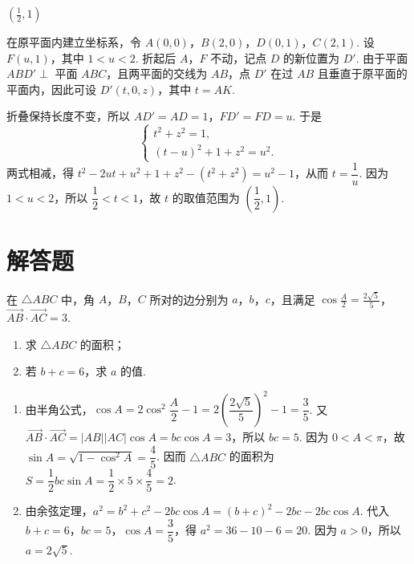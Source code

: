 \begin{answer}
\(\left(\frac{1}{2},1\right)\)
\end{answer}

\begin{solution}
在原平面内建立坐标系，令 \(A(0,0)\)，\(B(2,0)\)，\(D(0,1)\)，\(C(2,1)\). 设 \(F(u,1)\)，其中 \(1<u<2\). 折起后 \(A\)，\(F\) 不动，记点 \(D\) 的新位置为 \(D'\). 由于平面 \(ABD'\perp\) 平面 \(ABC\)，且两平面的交线为 \(AB\)，点 \(D'\) 在过 \(AB\) 且垂直于原平面的平面内，因此可设 \(D'(t,0,z)\)，其中 \(t=AK\).

折叠保持长度不变，所以 \(AD'=AD=1\)，\(FD'=FD=u\). 于是
\[
\begin{cases}
t^2+z^2=1,\\
(t-u)^2+1+z^2=u^2.
\end{cases}
\]
两式相减，得 \(t^2-2ut+u^2+1+z^2-(t^2+z^2)=u^2-1\)，从而 \(t=\dfrac1u\). 因为 \(1<u<2\)，所以 \(\dfrac12<t<1\)，故 \(t\) 的取值范围为 \(\left(\dfrac12,1\right)\).
\end{solution}

\section{解答题}

\begin{problem}
在 \(\triangle ABC\) 中，角 \(A\)，\(B\)，\(C\) 所对的边分别为 \(a\)，\(b\)，\(c\)，且满足 \(\cos\frac{A}{2}=\frac{2\sqrt{5}}{5}\)，\(\overrightarrow{AB}\cdot\overrightarrow{AC}=3\).
\begin{enumerate}
\item 求 \(\triangle ABC\) 的面积；
\item 若 \(b+c=6\)，求 \(a\) 的值.
\end{enumerate}
\end{problem}

\begin{solution}
\begin{enumerate}
\item 由半角公式，\(\cos A=2\cos^2\dfrac A2-1=2\left(\dfrac{2\sqrt5}{5}\right)^2-1=\dfrac35\). 又 \(\overrightarrow{AB}\cdot\overrightarrow{AC}=|AB||AC|\cos A=bc\cos A=3\)，所以 \(bc=5\). 因为 \(0<A<\pi\)，故 \(\sin A=\sqrt{1-\cos^2A}=\dfrac45\). 因而 \(\triangle ABC\) 的面积为 \(S=\dfrac12bc\sin A=\dfrac12\times5\times\dfrac45=2\).
\item 由余弦定理，\(a^2=b^2+c^2-2bc\cos A=(b+c)^2-2bc-2bc\cos A\). 代入 \(b+c=6\)，\(bc=5\)，\(\cos A=\dfrac35\)，得 \(a^2=36-10-6=20\). 因为 \(a>0\)，所以 \(a=2\sqrt5\).
\end{enumerate}
\end{solution}

